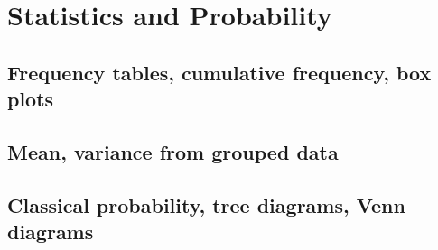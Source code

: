 
\section{Statistics and Probability}

\subsection{Frequency tables, cumulative frequency, box plots}


\subsection{Mean, variance from grouped data}


\subsection{Classical probability, tree diagrams, Venn diagrams}

